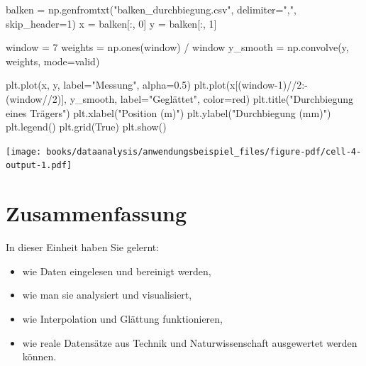 \documentclass[
  letterpaper,
  DIV=11,
  numbers=noendperiod]{scrreprt}
\newenvironment{Shaded}{\begin{snugshade}}{\end{snugshade}}
\newcommand{\DecValTok}[1]{\textcolor[rgb]{0.68,0.00,0.00}{#1}}
\newcommand{\FloatTok}[1]{\textcolor[rgb]{0.68,0.00,0.00}{#1}}
\newcommand{\NormalTok}[1]{\textcolor[rgb]{0.00,0.23,0.31}{#1}}
\newcommand{\OperatorTok}[1]{\textcolor[rgb]{0.37,0.37,0.37}{#1}}
\newcommand{\StringTok}[1]{\textcolor[rgb]{0.13,0.47,0.30}{#1}}
\newcommand{\VariableTok}[1]{\textcolor[rgb]{0.07,0.07,0.07}{#1}}
\providecommand{\tightlist}{%
  \setlength{\itemsep}{0pt}\setlength{\parskip}{0pt}}\usepackage{longtable,booktabs,array}
\begin{document}
\begin{Shaded}
\begin{Highlighting}[]
\NormalTok{balken }\OperatorTok{=}\NormalTok{ np.genfromtxt(}\StringTok{"balken\_durchbiegung.csv"}\NormalTok{, delimiter}\OperatorTok{=}\StringTok{","}\NormalTok{, skip\_header}\OperatorTok{=}\DecValTok{1}\NormalTok{)}
\NormalTok{x }\OperatorTok{=}\NormalTok{ balken[:, }\DecValTok{0}\NormalTok{]}
\NormalTok{y }\OperatorTok{=}\NormalTok{ balken[:, }\DecValTok{1}\NormalTok{]}

\NormalTok{window }\OperatorTok{=} \DecValTok{7}
\NormalTok{weights }\OperatorTok{=}\NormalTok{ np.ones(window) }\OperatorTok{/}\NormalTok{ window}
\NormalTok{y\_smooth }\OperatorTok{=}\NormalTok{ np.convolve(y, weights, mode}\OperatorTok{=}\StringTok{\textquotesingle{}valid\textquotesingle{}}\NormalTok{)}

\NormalTok{plt.plot(x, y, label}\OperatorTok{=}\StringTok{"Messung"}\NormalTok{, alpha}\OperatorTok{=}\FloatTok{0.5}\NormalTok{)}
\NormalTok{plt.plot(x[(window}\OperatorTok{{-}}\DecValTok{1}\NormalTok{)}\OperatorTok{//}\DecValTok{2}\NormalTok{:}\OperatorTok{{-}}\NormalTok{(window}\OperatorTok{//}\DecValTok{2}\NormalTok{)], y\_smooth, label}\OperatorTok{=}\StringTok{"Geglättet"}\NormalTok{, color}\OperatorTok{=}\StringTok{\textquotesingle{}red\textquotesingle{}}\NormalTok{)}
\NormalTok{plt.title(}\StringTok{"Durchbiegung eines Trägers"}\NormalTok{)}
\NormalTok{plt.xlabel(}\StringTok{"Position (m)"}\NormalTok{)}
\NormalTok{plt.ylabel(}\StringTok{"Durchbiegung (mm)"}\NormalTok{)}
\NormalTok{plt.legend()}
\NormalTok{plt.grid(}\VariableTok{True}\NormalTok{)}
\NormalTok{plt.show()}
\end{Highlighting}
\end{Shaded}

\texttt{[image: books/dataanalysis/anwendungsbeispiel\_files/figure-pdf/cell-4-output-1.pdf]}

\section{Zusammenfassung}\label{zusammenfassung}

In dieser Einheit haben Sie gelernt:

\begin{itemize}
\tightlist
\item
  wie Daten eingelesen und bereinigt werden,
\item
  wie man sie analysiert und visualisiert,
\item
  wie Interpolation und Glättung funktionieren,
\item
  wie reale Datensätze aus Technik und Naturwissenschaft ausgewertet
  werden können.
\end{itemize}
\end{document}
